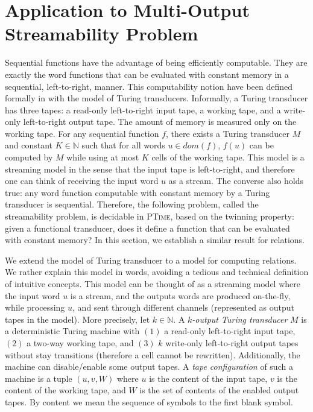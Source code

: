 \documentclass[envcountsame]{llncs}
\begin{document}
\section{Application to Multi-Output Streamability Problem}

Sequential functions have the advantage of being efficiently
computable. They are exactly the word functions that can be evaluated
with constant memory in a sequential, left-to-right, manner. This
computability notion have been defined formally in
\cite{DBLP:conf/fsttcs/FiliotGRS11} with the model of Turing
transducers. Informally, a Turing transducer has three tapes: a
read-only left-to-right input tape, a working tape, and a write-only
left-to-right output tape. The amount of memory is measured only on
the working tape. For any sequential function $f$, there exists a
Turing transducer $M$ and constant $K\in\mathbb{N}$ such that for all words $u\in
dom(f)$, $f(u)$ can be computed by $M$ while using at most $K$ cells of
the working tape. This model is a streaming model in the sense that 
the input tape is left-to-right, and therefore one can think of
receiving the input word $u$ as a stream. The converse also holds
true: any word function computable with constant memory by a Turing
transducer is sequential. Therefore, the following problem, called the
streamability problem, is decidable in \textsc{PTime}, based on the
twinning property: given a functional transducer, does it define a
function that can be evaluated with constant memory? In this section,
we establish a similar result for relations. 


We extend the model of Turing transducer to a model for computing
relations. We rather explain this model in words, avoiding a tedious
and technical definition of intuitive concepts. This model can be thought of as a streaming model where the input
word $u$ is a stream, and the outputs words are produced on-the-fly, while
processing $u$, and sent through different channels (represented as
output tapes in the model). More precisely, let $k\in\mathbb{N}$. 
A \emph{$k$-output Turing
transducer} $M$ is a deterministic Turing machine with $(1)$ a read-only
left-to-right input tape, $(2)$ a two-way working tape, and $(3)$ $k$
write-only left-to-right output tapes without stay
transitions (therefore a cell cannot be rewritten). Additionally, the
machine can disable/enable some output tapes. A \emph{tape
  configuration} of such a machine is a tuple $(u,v,W)$ where $u$ is
the content of the input tape, $v$ is the content of the working tape,
and $W$ is the set of contents of the enabled output tapes. By content we mean the sequence of
symbols to the first blank symbol.
\end{document}
